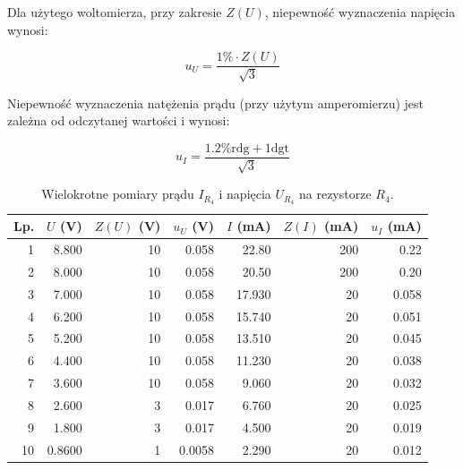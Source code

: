\documentclass[a4paper]{article}
\newlength{\du}
\begin{document}
\newpage

Dla użytego woltomierza, przy zakresie $Z(U)$, niepewność wyznaczenia napięcia wynosi:

$$u_U = \frac{1\% \cdot Z(U)}{\sqrt{3}}$$

Niepewność wyznaczenia natężenia prądu (przy użytym amperomierzu) jest zależna od odczytanej wartości i wynosi:

$$u_I = \frac{1.2\% \text{rdg} + 1 \text{dgt}}{\sqrt{3}}$$

\begin{table}
\centering
\begin{tabular}{rrrrrrr}
\toprule
Lp. &  $U$ (V) &  $Z(U)$ (V) &  $u_U$ (V) &  $I$ (mA) &  $Z(I)$ (mA) &  $u_I$ (mA) \\
\midrule
1 &          8.800  &                10 &                 0.058  &             22.80  &                200 &                     0.22 \\
2 &          8.000  &                10 &                 0.058  &             20.50  &                200 &                     0.20 \\
3 &          7.000  &                10 &                 0.058  &             17.930 &                 20 &                     0.058 \\
4 &          6.200  &                10 &                 0.058  &             15.740 &                 20 &                     0.051 \\
5 &          5.200  &                10 &                 0.058  &             13.510 &                 20 &                     0.045 \\
6 &          4.400  &                10 &                 0.058  &             11.230 &                 20 &                     0.038 \\
7 &          3.600  &                10 &                 0.058  &              9.060 &                 20 &                     0.032 \\
8 &          2.600  &                 3 &                 0.017  &              6.760 &                 20 &                     0.025 \\
9 &          1.800  &                 3 &                 0.017  &              4.500 &                 20 &                     0.019 \\
10 &         0.8600 &                 1 &                 0.0058 &              2.290 &                 20 &                     0.012 \\
\bottomrule
\end{tabular}
\caption{Wielokrotne pomiary prądu $I_{R_4}$ i napięcia $U_{R_4}$ na rezystorze $R_4$.}
\label{pomiary_r4}
\end{table}
\end{document}
